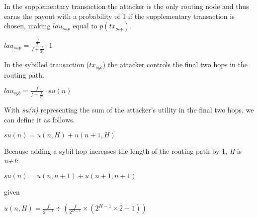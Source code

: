 \documentclass[oneside]{article}   	%
\begin{document}
\begin{multicols}{2}
In the supplementary transaction the attacker is the only routing node and thus earns the payout with a probability of 1 if the supplementary transaction is chosen, making \begin{math}lau_{sup}\end{math} equal to \begin{math}p(tx_{sup})\end{math}.

\large
\begin{adjustwidth}{1.5em}{1.5em} 
	\begin{math}
lau_{sup} = \frac{\frac{f}{2^n}}{f + \frac{f}{2^n}} \cdot 1
	\end{math}
\end{adjustwidth}
\normalsize

In the sybilled transaction (\begin{math}tx_{syb}\end{math}) the attacker controls the final two hops in the routing path.

 \large
\begin{adjustwidth}{1.5em}{1.5em} 
	\begin{math}
lau_{syb} = \frac{f}{f + \frac{f}{2^n}} \cdot su(n)
	\end{math}
\end{adjustwidth}
\normalsize

With \textit{su(n)} representing the sum of the attacker's utility in the final two hops, we can define it as follows.

\large
\begin{adjustwidth}{1.5em}{1.5em} 
	\begin{math}
su(n) = u(n, H) + u(n+1, H)
	\end{math}
\end{adjustwidth}
\normalsize

Because adding a sybil hop increases the length of the routing path by 1, \textit{H} is \textit{n+1}:

\large
\begin{adjustwidth}{1.5em}{1.5em} 
	\begin{math}
su(n) = u(n, n+1) + u(n+1, n+1)
	\end{math}
\end{adjustwidth}
\normalsize

given

\large
\begin{adjustwidth}{1.5em}{1.5em} 
	\begin{math}
u(n,H) = \frac{f}{2^{n-1}} \div \left(\frac{f}{2^{H-1}} \times \left(2^{H-1} \times 2 - 1\right)\right)
	\end{math}


\end{adjustwidth}
\end{multicols}
\end{document}
